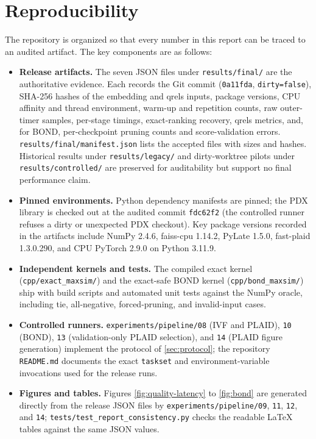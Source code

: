 \section{Reproducibility}
\label{sec:reproducibility}

The repository is organized so that every number in this report can be traced 
to an audited artifact. The key components are as follows:

\begin{itemize}
  \item \textbf{Release artifacts.} The seven JSON files under
    \texttt{results/final/} are the authoritative evidence. Each records the
    Git commit (\texttt{0a11fda}, \texttt{dirty=false}), SHA-256 hashes of the
    embedding and qrels inputs, package versions, CPU affinity and thread
    environment, warm-up and repetition counts, raw outer-timer samples,
    per-stage timings, exact-ranking recovery, qrels metrics, and, for BOND,
    per-checkpoint pruning counts and score-validation errors.
    \texttt{results/final/manifest.json} lists the accepted files with sizes
    and hashes. Historical results under \texttt{results/legacy/} and
    dirty-worktree pilots under \texttt{results/controlled/} are preserved for
    auditability but support no final performance claim.
  \item \textbf{Pinned environments.} Python dependency manifests are pinned;
    the PDX library is checked out at the audited commit \texttt{fdc62f2}
    (the controlled runner refuses a dirty or unexpected PDX checkout).
    Key package versions recorded in the artifacts include NumPy 2.4.6,
    faiss-cpu 1.14.2, PyLate 1.5.0, fast-plaid 1.3.0.290, and CPU
    PyTorch 2.9.0 on Python 3.11.9.
  \item \textbf{Independent kernels and tests.} The compiled exact kernel
    (\texttt{cpp/exact\_maxsim/}) and the exact-safe BOND kernel
    (\texttt{cpp/bond\_maxsim/}) ship with build scripts and automated
    unit tests against the NumPy oracle, including tie, all-negative,
    forced-pruning, and invalid-input cases.
  \item \textbf{Controlled runners.} \texttt{experiments/pipeline/08}
    (IVF and PLAID), \texttt{10} (BOND), \texttt{13} (validation-only PLAID
    selection), and \texttt{14} (PLAID figure generation) implement the protocol of
    \cref{sec:protocol}; the repository \texttt{README.md} documents the
    exact \texttt{taskset} and environment-variable invocations used for the
    release runs.
  \item \textbf{Figures and tables.} Figures
    \ref{fig:quality-latency} to \ref{fig:bond} are generated directly from the
    release JSON files by \texttt{experiments/pipeline/09}, \texttt{11},
    \texttt{12}, and \texttt{14}; \texttt{tests/test\_report\_consistency.py}
    checks the readable LaTeX tables against the same JSON values.
\end{itemize}

